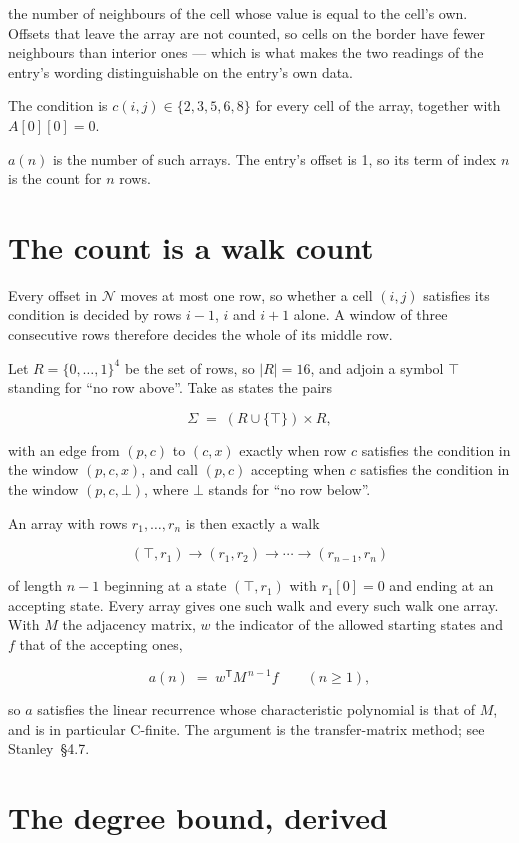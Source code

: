 \documentclass[11pt]{article}
\theoremstyle{definition}
\begin{document}
the number of neighbours of the cell whose value is equal to the cell's own. Offsets that leave the array are not counted, so cells on the border have fewer neighbours than interior ones --- which is what makes the two readings of the entry's wording distinguishable on the entry's own data.

The condition is $c(i,j) \in \{2, 3, 5, 6, 8\}$ for every cell of the array, together with $A[0][0]=0$.

$a(n)$ is the number of such arrays. The entry's offset is 1, so its term of index $n$ is the count for $n$ rows.

\section{The count is a walk count}

Every offset in $\mathcal{N}$ moves at most one row, so whether a cell $(i,j)$ satisfies its condition is decided by rows $i-1$, $i$ and $i+1$ alone. A window of three consecutive rows therefore decides the whole of its middle row.

Let $R = \{0,\dots,1\}^{4}$ be the set of rows, so $|R| = 16$, and adjoin a symbol $\top$ standing for ``no row above''. Take as states the pairs

\[\Sigma \;=\; (R \cup \{\top\}) \times R,\]

with an edge from $(p,c)$ to $(c,x)$ exactly when row $c$ satisfies the condition in the window $(p,c,x)$, and call $(p,c)$ accepting when $c$ satisfies the condition in the window $(p,c,\bot)$, where $\bot$ stands for ``no row below''.

An array with rows $r_1,\dots,r_n$ is then exactly a walk

\[(\top,r_1) \to (r_1,r_2) \to \cdots \to (r_{n-1},r_n)\]

of length $n-1$ beginning at a state $(\top,r_1)$ with $r_1[0]=0$ and ending at an accepting state. Every array gives one such walk and every such walk one array. With $M$ the adjacency matrix, $w$ the indicator of the allowed starting states and $f$ that of the accepting ones,

\[a(n) \;=\; w^{\mathsf T} M^{\,n-1} f \qquad (n \ge 1),\]

so $a$ satisfies the linear recurrence whose characteristic polynomial is that of $M$, and is in particular C-finite. The argument is the transfer-matrix method; see Stanley~\S4.7.

\section{The degree bound, derived}
\end{document}

